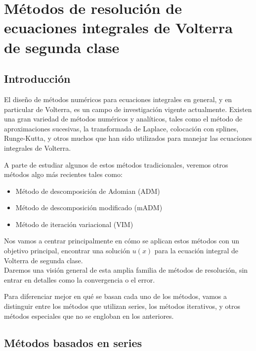 \chapter{Métodos de resolución de ecuaciones integrales de Volterra de segunda clase}

\section{Introducción}
El diseño de métodos numéricos para ecuaciones integrales en general, y en particular de Volterra, es un campo de investigación vigente actualmente.
Existen una gran variedad de métodos numéricos y analíticos, tales como el método de aproximaciones sucesivas, la transformada de Laplace, colocación con splines, Runge-Kutta, y otros muchos que han sido utilizados para manejar las ecuaciones integrales de Volterra.

A parte de estudiar algunos de estos métodos tradicionales, veremos otros métodos algo más recientes tales como:
\begin{itemize}
	\item Método de descomposición de Adomian (ADM)
	\item Método de descomposición modificado (mADM)
	\item Método de iteración variacional (VIM)
\end{itemize}
Nos vamos a centrar principalmente en cómo se aplican estos métodos con un objetivo principal, encontrar una solución $u(x)$ para la ecuación integral de Volterra de segunda clase.\\Daremos una visión general de esta amplia familia de métodos de resolución, sin entrar en detalles como la convergencia o el error.

Para diferenciar mejor en qué se basan cada uno de los métodos, vamos a distinguir entre los métodos que utilizan series, los métodos iterativos, y otros métodos especiales que no se engloban en los anteriores.
\section{Métodos basados en series}
